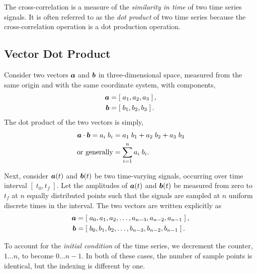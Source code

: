 
The cross-correlation is a measure of the {\em similarity  
in time}
of two time series signals.  It is often referred to as
the {\em dot product} of two time series because 
the cross-correlation operation is a dot production operation.

\subsection{Vector Dot Product}
\label{section:vdp}
Consider two vectors $\mbox{\boldmath $a$}$ and $\mbox{\boldmath $b$}$ in three-dimensional
space, measured from the same origin and with the same 
coordinate system, with components,
\begin{align}
\mbox{\boldmath $a$} & = \left[ \; a_1, a_2, a_3 \; \right], \\
\mbox{\boldmath $b$} & = \left[ \; b_1, b_2, b_3 \; \right]. 
\end{align}
The dot product of the two vectors is simply,
\begin{align}
 \mbox{\boldmath $a$} \cdot \mbox{\boldmath $b$} = a_i \; b_i 
 & = a_1 \; b_1 + a_2 \; b_2 + a_3 \; b_3 \\
 \mbox{or generally} 
 & = 
 \sum_{i=1}^n a_i \; b_i.
\end{align} 

Next, consider $\mbox{\boldmath $a$}(t)$ and $\mbox{\boldmath $b$}(t)$ be two time-varying
signals, occurring over time interval $[\;t_0, t_f\;]$. 
Let the amplitudes of $\mbox{\boldmath $a$}(t)$ 
and $\mbox{\boldmath $b$}(t)$ be measured from zero to $t_f$ at $n$ equally
distributed points such that the signals are sampled 
at $n$ uniform discrete times in the interval.
The two vectors are written explicitly as
\begin{align}
\mbox{\boldmath $a$} & = 
\left[ 
\; a_0, a_1, a_2, \ldots, 
 a_{n-3},
 a_{n-2},
 a_{n-1}
 \;
\right],  \\
\mbox{\boldmath $b$} & = 
\left[ 
\; b_0, b_1, b_2, \ldots, 
 b_{n-3},
 b_{n-2},
 b_{n-1}
 \;
\right].
\end{align}

\begin{Hremark}
To account for the {\em initial condition} of the time series, 
we decrement the counter, $1 \ldots n$, to become $0 \ldots n-1$.
In both of these cases, the number of sample 
points is identical, but the indexing is different by one. 
\end{Hremark}

